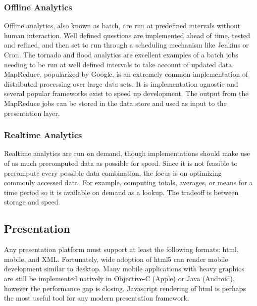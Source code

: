 \subsubsection{Offline Analytics}
Offline analytics, also known as batch, are run at predefined intervals without human interaction. Well defined questions are implemented ahead of time, tested and refined, and then set to run through a scheduling mechanism like Jenkins or Cron. The tornado and flood analytics are excellent examples of a batch jobs needing to be run at well defined intervals to take account of updated data. MapReduce, popularized by Google, is an extremely common implementation of distributed processing over large data sets. It is implementation agnostic and several popular frameworks exist to speed up development. The output from the MapReduce jobs can be stored in the data store and used as input to the presentation layer.
\subsubsection{Realtime Analytics}
Realtime analytics are run on demand, though implementations should make use of as much precomputed data as possible for speed. Since it is not feasible to precompute every possible data combination, the focus is on optimizing commonly accessed data. For example, computing totals, averages, or means for a time period so it is available on demand as a lookup. The tradeoff is between storage and speed. 
\subsection{Presentation}
Any presentation platform must support at least the following formats: \gls{html}, mobile, and XML. Fortunately, wide adoption of \gls{html}5 can render mobile development similar to desktop. Many mobile applications with heavy graphics are still be implemented natively in Objective-C (Apple) or Java (Android), however the performance gap is closing. Javascript rendering of \gls{html} is perhaps the most useful tool for any modern presentation framework.